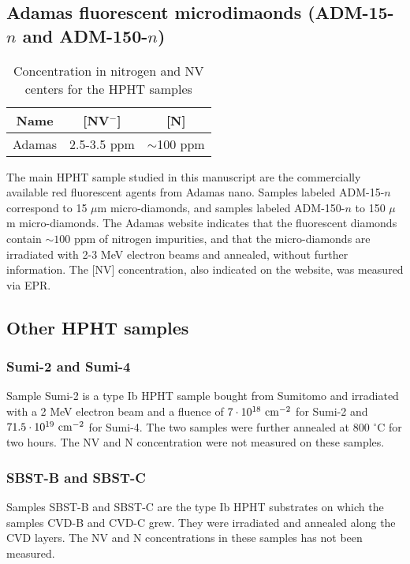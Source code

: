 \documentclass[a4paper, 11pt]{report}
\begin{document}
\subsection{Adamas fluorescent microdimaonds (ADM-15-$n$ and ADM-150-$n$)}
\begin{table}[htbp]
\centering
\caption{Concentration in nitrogen and NV centers for the HPHT samples}
\label{Table samples adamas}
\begin{tabular}{c|cc}
\toprule
Name & [NV$^-$] & [N] \\
\midrule
Adamas & 2.5-3.5 ppm & $\sim$100 ppm \\

\bottomrule
\end{tabular}
\end{table}

The main HPHT sample studied in this manuscript are the commercially available red fluorescent agents from Adamas nano. Samples labeled ADM-15-$n$ correspond to 15 $\mu$m micro-diamonds, and samples labeled ADM-150-$n$ to 150 $\mu$m micro-diamonds. The Adamas website indicates that the fluorescent diamonds contain $\sim 100$ ppm of nitrogen impurities, and that the micro-diamonds are irradiated with 2-3 MeV electron beams and annealed, without further information. The [NV] concentration, also indicated on the website, was measured via EPR.

\subsection{Other HPHT samples}
\subsubsection{Sumi-2 and Sumi-4}
Sample Sumi-2 is a type Ib HPHT sample bought from Sumitomo and irradiated with a 2 MeV electron beam and a fluence of $7\cdot 10^{18}\ \rm cm^{-2}$ for Sumi-2 and $71.5\cdot 10^{19}\ \rm cm^{-2}$ for Sumi-4. The two samples were further annealed at 800 $^\circ$C for two hours. The NV and N concentration were not measured on these samples.
\subsubsection{SBST-B and SBST-C}
Samples SBST-B and SBST-C are the type Ib HPHT substrates on which the samples CVD-B and CVD-C grew. They were irradiated and annealed along the CVD layers. The NV and N concentrations in these samples has not been measured.
\end{document}
